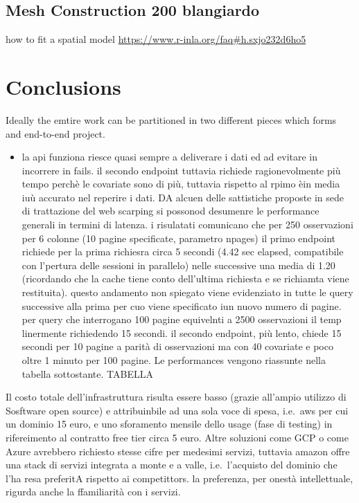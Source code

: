 \documentclass[
  12pt,
  a4paper,
  oneside]{book}
\providecommand{\tightlist}{%
  \setlength{\itemsep}{0pt}\setlength{\parskip}{0pt}}
\theoremstyle{definition}
\theoremstyle{definition}
\theoremstyle{definition}
\theoremstyle{remark}
\begin{document}
\hypertarget{mesh-construction-200-blangiardo}{%
\section{Mesh Construction 200 blangiardo}\label{mesh-construction-200-blangiardo}}

how to fit a spatial model
\url{https://www.r-inla.org/faq\#h.sxjo232d6ho5}

\hypertarget{conclusions}{%
\chapter{Conclusions}\label{conclusions}}

Ideally the emtire work can be partitioned in two different pieces which forms and end-to-end project.

\begin{itemize}
\tightlist
\item
  la api funziona riesce quasi sempre a deliverare i dati ed ad evitare in incorrere in fails. il secondo endpoint tuttavia richiede ragionevolmente più tempo perchè le covariate sono di più, tuttavia rispetto al rpimo èin media iuù accurato nel reperire i dati. DA alcuen delle sattistiche proposte in sede di trattazione del web scarping si possonod desumenre le performance generali in termini di latenza. i risulatati comunicano che per 250 osservazioni per 6 colonne (10 pagine specificate, parametro npages) il primo endpoint richiede per la prima richiesra circa 5 secondi (4.42 sec elapsed, compatibile con l'pertura delle sessioni in parallelo) nelle successive una media di 1.20 (ricordando che la cache tiene conto dell'ultima richiesta e se richiamta viene restituita). questo andamento non spiegato viene evidenziato in tutte le query successive alla prima per cuo viene specificato iun nuovo numero di pagine. per query che interrogano 100 pagine equivelnti a 2500 osservazioni il temp linermente richiedendo 15 secondi. il secondo endpoint, più lento, chiede 15 secondi per 10 pagine a parità di osservazioni ma con 40 covariate e poco oltre 1 minuto per 100 pagine. Le performances vengono riassunte nella tabella sottostante. TABELLA
\end{itemize}

Il costo totale dell'infrastruttura risulta essere basso (grazie all'ampio utilizzo di Sosftware open source) e attribuinbile ad una sola voce di spesa, i.e.~aws per cui un dominio 15 euro, e uno sforamento mensile dello usage (fase di testing) in rifereimento al contratto free tier circa 5 euro. Altre soluzioni come GCP o come Azure avrebbero richiesto stesse cifre per medesimi servizi, tuttavia amazon offre una stack di servizi integrata a monte e a valle, i.e.~l'acquisto del dominio che l'ha resa preferitA rispetto ai competittors. la preferenza, per onestà intellettuale, rigurda anche la ffamiliarità con i servizi.
\end{document}
